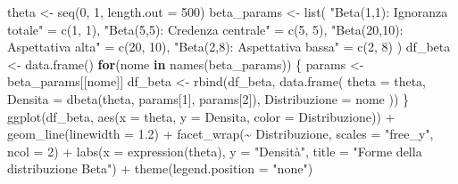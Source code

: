 \documentclass[
  italian,
  letterpaper,
  a4paper,
  11pt,
  open=any]{scrbook}
\newenvironment{Shaded}{\begin{snugshade}}{\end{snugshade}}
\newcommand{\AttributeTok}[1]{\textcolor[rgb]{0.40,0.45,0.13}{#1}}
\newcommand{\ControlFlowTok}[1]{\textcolor[rgb]{0.00,0.23,0.31}{\textbf{#1}}}
\newcommand{\DecValTok}[1]{\textcolor[rgb]{0.68,0.00,0.00}{#1}}
\newcommand{\FloatTok}[1]{\textcolor[rgb]{0.68,0.00,0.00}{#1}}
\newcommand{\FunctionTok}[1]{\textcolor[rgb]{0.28,0.35,0.67}{#1}}
\newcommand{\NormalTok}[1]{\textcolor[rgb]{0.00,0.23,0.31}{#1}}
\newcommand{\OtherTok}[1]{\textcolor[rgb]{0.00,0.23,0.31}{#1}}
\newcommand{\SpecialCharTok}[1]{\textcolor[rgb]{0.37,0.37,0.37}{#1}}
\newcommand{\StringTok}[1]{\textcolor[rgb]{0.13,0.47,0.30}{#1}}
\newcounter{none} %
\theoremstyle{plain}
\theoremstyle{definition}
\theoremstyle{definition}
\theoremstyle{remark}
\begin{document}
\begin{Shaded}
\begin{Highlighting}[]
\NormalTok{theta }\OtherTok{\textless{}{-}} \FunctionTok{seq}\NormalTok{(}\DecValTok{0}\NormalTok{, }\DecValTok{1}\NormalTok{, }\AttributeTok{length.out =} \DecValTok{500}\NormalTok{)}
\NormalTok{beta\_params }\OtherTok{\textless{}{-}} \FunctionTok{list}\NormalTok{(}
  \StringTok{"Beta(1,1): Ignoranza totale"} \OtherTok{=} \FunctionTok{c}\NormalTok{(}\DecValTok{1}\NormalTok{, }\DecValTok{1}\NormalTok{),}
  \StringTok{"Beta(5,5): Credenza centrale"} \OtherTok{=} \FunctionTok{c}\NormalTok{(}\DecValTok{5}\NormalTok{, }\DecValTok{5}\NormalTok{),}
  \StringTok{"Beta(20,10): Aspettativa alta"} \OtherTok{=} \FunctionTok{c}\NormalTok{(}\DecValTok{20}\NormalTok{, }\DecValTok{10}\NormalTok{),}
  \StringTok{"Beta(2,8): Aspettativa bassa"} \OtherTok{=} \FunctionTok{c}\NormalTok{(}\DecValTok{2}\NormalTok{, }\DecValTok{8}\NormalTok{)}
\NormalTok{)}
\NormalTok{df\_beta }\OtherTok{\textless{}{-}} \FunctionTok{data.frame}\NormalTok{()}
\ControlFlowTok{for}\NormalTok{(nome }\ControlFlowTok{in} \FunctionTok{names}\NormalTok{(beta\_params)) \{}
\NormalTok{  params }\OtherTok{\textless{}{-}}\NormalTok{ beta\_params[[nome]]}
\NormalTok{  df\_beta }\OtherTok{\textless{}{-}} \FunctionTok{rbind}\NormalTok{(df\_beta, }\FunctionTok{data.frame}\NormalTok{(}
    \AttributeTok{theta =}\NormalTok{ theta,}
    \AttributeTok{Densita =} \FunctionTok{dbeta}\NormalTok{(theta, params[}\DecValTok{1}\NormalTok{], params[}\DecValTok{2}\NormalTok{]),}
    \AttributeTok{Distribuzione =}\NormalTok{ nome}
\NormalTok{  ))}
\NormalTok{\}}
\FunctionTok{ggplot}\NormalTok{(df\_beta, }\FunctionTok{aes}\NormalTok{(}\AttributeTok{x =}\NormalTok{ theta, }\AttributeTok{y =}\NormalTok{ Densita, }\AttributeTok{color =}\NormalTok{ Distribuzione)) }\SpecialCharTok{+}
  \FunctionTok{geom\_line}\NormalTok{(}\AttributeTok{linewidth =} \FloatTok{1.2}\NormalTok{) }\SpecialCharTok{+}
  \FunctionTok{facet\_wrap}\NormalTok{(}\SpecialCharTok{\textasciitilde{}}\NormalTok{ Distribuzione, }\AttributeTok{scales =} \StringTok{"free\_y"}\NormalTok{, }\AttributeTok{ncol =} \DecValTok{2}\NormalTok{) }\SpecialCharTok{+}
  \FunctionTok{labs}\NormalTok{(}\AttributeTok{x =} \FunctionTok{expression}\NormalTok{(theta), }\AttributeTok{y =} \StringTok{"Densità"}\NormalTok{,}
       \AttributeTok{title =} \StringTok{"Forme della distribuzione Beta"}\NormalTok{) }\SpecialCharTok{+}
  \FunctionTok{theme}\NormalTok{(}\AttributeTok{legend.position =} \StringTok{"none"}\NormalTok{)}
\end{Highlighting}
\end{Shaded}
\end{document}
